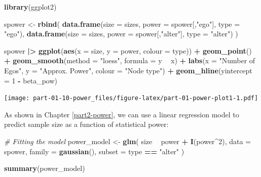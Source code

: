 \documentclass[]{book}
\newenvironment{Shaded}{\begin{snugshade}}{\end{snugshade}}
\newcommand{\CommentTok}[1]{\textcolor[rgb]{0.56,0.35,0.01}{\textit{#1}}}
\newcommand{\DataTypeTok}[1]{\textcolor[rgb]{0.13,0.29,0.53}{#1}}
\newcommand{\DecValTok}[1]{\textcolor[rgb]{0.00,0.00,0.81}{#1}}
\newcommand{\ErrorTok}[1]{\textcolor[rgb]{0.64,0.00,0.00}{\textbf{#1}}}
\newcommand{\KeywordTok}[1]{\textcolor[rgb]{0.13,0.29,0.53}{\textbf{#1}}}
\newcommand{\NormalTok}[1]{#1}
\newcommand{\OperatorTok}[1]{\textcolor[rgb]{0.81,0.36,0.00}{\textbf{#1}}}
\newcommand{\StringTok}[1]{\textcolor[rgb]{0.31,0.60,0.02}{#1}}
\begin{document}
\begin{Shaded}
\begin{Highlighting}[]
\KeywordTok{library}\NormalTok{(ggplot2)}

\NormalTok{spower <-}\StringTok{ }\KeywordTok{rbind}\NormalTok{(}
  \KeywordTok{data.frame}\NormalTok{(}\DataTypeTok{size =}\NormalTok{ sizes, }\DataTypeTok{power =}\NormalTok{ spower[,}\StringTok{"ego"}\NormalTok{], }\DataTypeTok{type =}  \StringTok{"ego"}\NormalTok{),}
  \KeywordTok{data.frame}\NormalTok{(}\DataTypeTok{size =}\NormalTok{ sizes, }\DataTypeTok{power =}\NormalTok{ spower[,}\StringTok{"alter"}\NormalTok{], }\DataTypeTok{type =}  \StringTok{"alter"}\NormalTok{)}
\NormalTok{)}

\NormalTok{spower }\OperatorTok{|}\ErrorTok{>}
\StringTok{  }\KeywordTok{ggplot}\NormalTok{(}\KeywordTok{aes}\NormalTok{(}\DataTypeTok{x =}\NormalTok{ size, }\DataTypeTok{y =}\NormalTok{ power, }\DataTypeTok{colour =}\NormalTok{ type)) }\OperatorTok{+}
\StringTok{  }\KeywordTok{geom_point}\NormalTok{() }\OperatorTok{+}
\StringTok{  }\KeywordTok{geom_smooth}\NormalTok{(}\DataTypeTok{method =} \StringTok{"loess"}\NormalTok{, }\DataTypeTok{formula =}\NormalTok{ y }\OperatorTok{~}\StringTok{ }\NormalTok{x) }\OperatorTok{+}
\StringTok{  }\KeywordTok{labs}\NormalTok{(}\DataTypeTok{x =} \StringTok{"Number of Egos"}\NormalTok{, }\DataTypeTok{y =} \StringTok{"Approx. Power"}\NormalTok{, }\DataTypeTok{colour =} \StringTok{"Node type"}\NormalTok{) }\OperatorTok{+}
\StringTok{  }\KeywordTok{geom_hline}\NormalTok{(}\DataTypeTok{yintercept =} \DecValTok{1} \OperatorTok{-}\StringTok{ }\NormalTok{beta_pow)}
\end{Highlighting}
\end{Shaded}

\texttt{[image: part-01-10-power\_files/figure-latex/part-01-power-plot1-1.pdf]}

As shown in Chapter \ref{part2-power}, we can use a linear regression model to predict sample size as a function of statistical power:

\begin{Shaded}
\begin{Highlighting}[]
\CommentTok{# Fitting the model}
\NormalTok{power_model <-}\StringTok{ }\KeywordTok{glm}\NormalTok{(}
\NormalTok{  size }\OperatorTok{~}\StringTok{ }\NormalTok{power }\OperatorTok{+}\StringTok{ }\KeywordTok{I}\NormalTok{(power}\OperatorTok{^}\DecValTok{2}\NormalTok{),}
  \DataTypeTok{data =}\NormalTok{ spower, }\DataTypeTok{family =} \KeywordTok{gaussian}\NormalTok{(), }\DataTypeTok{subset =}\NormalTok{ type }\OperatorTok{==}\StringTok{ "alter"}
\NormalTok{)}

\KeywordTok{summary}\NormalTok{(power_model)}
\end{Highlighting}
\end{Shaded}
\end{document}
